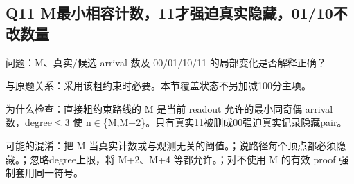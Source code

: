 \documentclass[11pt,a4paper]{article}
\begin{document}
\clearpage
\subsection{Q11 M最小相容计数，11才强迫真实隐藏，01/10不改数量}
\label{aspect:Q11}
问题：M、真实/候选 arrival 数及 00/01/10/11 的局部变化是否解释正确？

与原题关系：采用该粗约束时必要。本节覆盖状态不另加减100分主项。

为什么检查：直接粗约束路线的 M 是当前 readout 允许的最小同奇偶 arrival 数，degree\ensuremath{\leq}3 使 n\ensuremath{\in}\{M,M+2\}。只有真实11被删成00强迫真实记录隐藏pair。

可能的混淆：把 M 当真实计数或与观测无关的阈值。；说路径每个顶点都必须隐藏。；忽略degree上限，将 M+2、M+4 等都允许。；对不使用 M 的有效 proof 强制套用同一符号。
\end{document}
